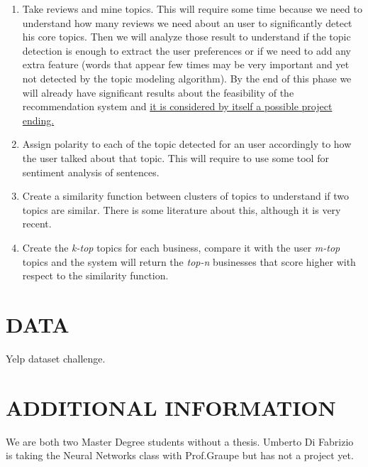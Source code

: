 \documentclass[a4paper, 10pt, conference]{ieeeconf}      %
\begin{document}
\begin{enumerate}
	\item Take reviews and mine topics. This will require some time because we need to understand how many reviews we need about an user to significantly detect his core topics. Then we will analyze those result to understand if the topic detection is enough to extract the user preferences or if we need to add any extra feature (words that appear few times may be very important and yet not detected by the topic modeling algorithm). By the end of this phase we will already have significant results about the feasibility of the recommendation system and \underline{it is considered by itself a possible project ending.}
	\item Assign polarity to each of the topic detected for an user accordingly to how the user talked about that topic. This will require to use some tool for sentiment analysis of sentences.
	\item Create a similarity function between clusters of topics to understand if two topics are similar. There is some literature about this, although it is very recent\cite{sim}.
	\item Create the \textit{k-top} topics for each business, compare it with the user \textit{m-top} topics and the system will return the \textit{top-n} businesses that score higher with respect to the similarity function. 
\end{enumerate}
\section{DATA}
Yelp dataset challenge\cite{yelp}.
\newpage
\section{ADDITIONAL INFORMATION}
We are both two Master Degree students without a thesis.
Umberto Di Fabrizio is taking the Neural Networks class with Prof.Graupe but has not a project yet.
\addtolength{\textheight}{-12cm}   %
\end{document}
